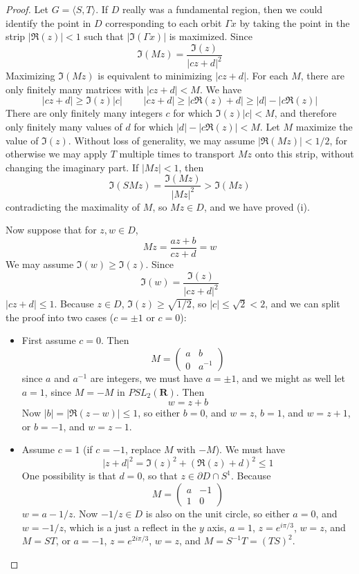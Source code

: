 \begin{proof}
    Let $G = \langle S,T \rangle$. If $D$ really was a fundamental region, then we could identify the point in $D$ corresponding to each orbit $\Gamma x$ by taking the point in the strip $|\Re(z)| < 1$ such that $|\Im(\Gamma x)|$ is maximized. Since
    \[ \Im(Mz) = \frac{\Im(z)}{|cz+d|^2} \]
    Maximizing $\Im(Mz)$ is equivalent to minimizing $|cz + d|$. For each $M$, there are only finitely many matrices with $|cz + d| < M$. We have
    \[ |cz + d| \geq \Im(z) |c|\ \ \ \ \ \ \ \ \ \ |cz + d| \geq |c \Re(z) + d| \geq |d| - |c \Re(z)| \]
    There are only finitely many integers $c$ for which $\Im(z) |c| < M$, and therefore only finitely many values of $d$ for which $|d| - |c \Re(z)| < M$. Let $M$ maximize the value of $\Im(z)$. Without loss of generality, we may assume $|\Re(Mz)| < 1/2$, for otherwise we may apply $T$ multiple times to transport $Mz$ onto this strip, without changing the imaginary part. If $|Mz| < 1$, then
    \[ \Im(SMz) = \frac{\Im(Mz)}{|Mz|^2} > \Im(Mz) \]
    contradicting the maximality of $M$, so $Mz \in D$, and we have proved (i).

    Now suppose that for $z,w \in D$,
    \[ Mz = \frac{az + b}{cz + d} = w \]
    We may assume $\Im(w) \geq \Im(z)$. Since
    \[ \Im(w) = \frac{\Im(z)}{|cz + d|^2} \]
    $|cz + d| \leq 1$. Because $z \in D$, $\Im(z) \geq \sqrt{1/2}$, so $|c| \leq \sqrt{2} < 2$, and we can split the proof into two cases ($c = \pm 1$ or $c = 0$):

    \begin{itemize}
        \item First assume $c = 0$. Then
        \[ M = \begin{pmatrix} a & b \\ 0 & a^{-1} \end{pmatrix} \]
        since $a$ and $a^{-1}$ are integers, we must have $a = \pm 1$, and we might as well let $a = 1$, since $M = - M$ in $PSL_2(\mathbf{R})$. Then
        \[ w = z + b \]
        Now $|b| = |\Re(z-w)| \leq 1$, so either $b = 0$, and $w = z$, $b = 1$, and $w = z + 1$, or $b = -1$, and $w = z - 1$.

        \item Assume $c = 1$ (if $c = -1$, replace $M$ with $-M$). We must have
        \[ |z + d|^2 = \Im(z)^2 + (\Re(z) + d)^2 \leq 1 \]
        One possibility is that $d = 0$, so that $z \in \partial D \cap S^1$. Because
        \[ M = \begin{pmatrix} a & -1 \\ 1 & 0 \end{pmatrix} \]
        $w = a - 1/z$. Now $-1/z \in D$ is also on the unit circle, so either $a = 0$, and $w = -1/z$, which is a just a reflect in the $y$ axis, $a = 1$, $z = e^{i\pi/3}$, $w = z$, and $M = ST$, or $a = -1$, $z = e^{2i\pi/3}$, $w = z$, and $M = S^{-1}T = (TS)^2$.


\end{itemize}
\end{proof}
